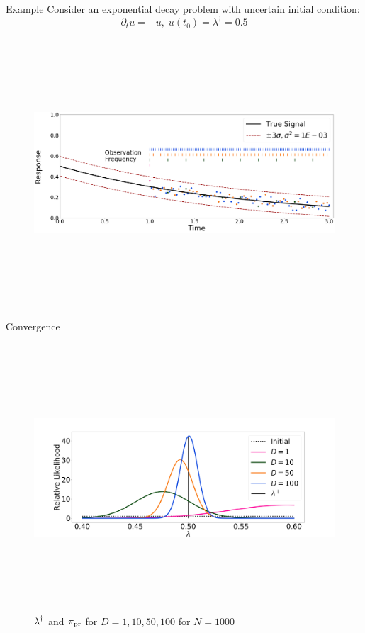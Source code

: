 \begin{block}{Example}
\centering
    Consider an exponential decay problem with uncertain initial condition:
    \begin{equation*}
        \partial_t u = - u, \; u(t_0) = \lambda^\dagger = 0.5
    \end{equation*}

    \begin{figure}
        \includegraphics[height=10cm]{exponential_decay_response_sigma-10E-4}
    \end{figure}

\end{block}

\vspace{-1cm}

\begin{block}{Convergence}
\centering

    \begin{figure}
        \includegraphics[height=10cm]{updated_convergence_sigma-10E-4}
        \caption*{\large $\operatorname*{\lambda}^\dagger$ and $\operatorname*{\pi_{pr}}$ for $D=1, 10, 50, 100$ for $N=1000$}
    \end{figure}

\end{block}

